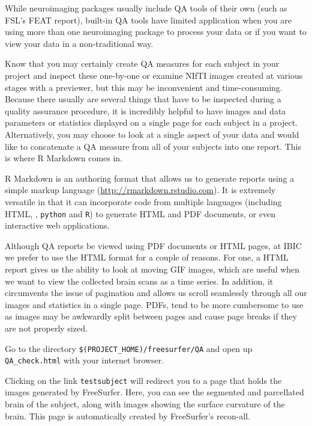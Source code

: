 While neuroimaging packages usually include QA tools of their own (such as FSL's FEAT report), built-in QA tools have limited application when you are using more than one neuroimaging package to process your data or if you want to view your data in a non-traditional way. 

Know that you may certainly create QA measures for each subject in your project and inspect these one-by-one or examine NIfTI images created at various stages with a previewer, but this may be inconvenient and time-consuming. Because there usually are several things that have to be inspected during a quality assurance procedure, it is incredibly helpful to have images and data parameters or statistics displayed on a single page for each subject in a project. Alternatively, you may choose to look at a single aspect of your data and would like to concatenate a QA measure from all of your subjects into one report. This is where R Markdown comes in.

R Markdown is an authoring format that allows us to generate reports using a simple markup language (\url{http://rmarkdown.rstudio.com}). It is extremely versatile in that it can incorporate code from multiple languages (including HTML, \bashn{}, \texttt{python} and \texttt{R}) to generate HTML and PDF documents, or even interactive web applications. 

Although QA reports be viewed using PDF documents or HTML pages, at IBIC we prefer to use the HTML format for a couple of reasons. For one, a HTML report gives us the ability to look at moving GIF images, which are useful when we want to view the collected brain scans as a time series. In addition, it circumvents the issue of pagination and allows us scroll seamlessly through all our images and statistics in a single page. PDFs, tend to be more cumbersome to use as images may be awkwardly split between pages and cause page breaks if they are not properly sized.

Go to the directory \texttt{\$(PROJECT\_HOME)/freesurfer/QA} and open up \texttt{QA\_check.html} with your internet browser. 

Clicking on the link \texttt{testsubject} will redirect you to a page that holds the images generated by FreeSurfer. Here, you can see the segmented and parcellated brain of the subject, along with images showing the surface curvature of the brain. This page is automatically created by FreeSurfer's recon-all.

